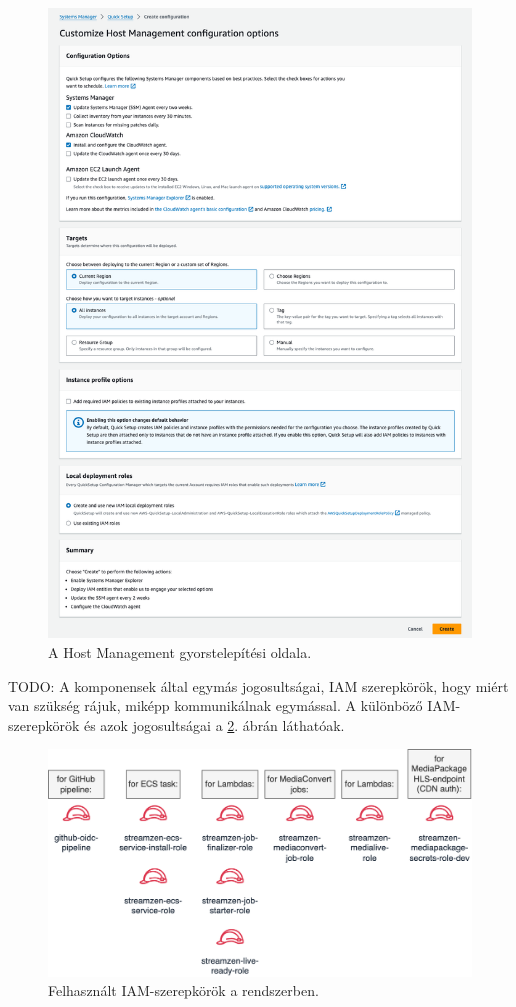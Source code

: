 \begin{figure}[ht]
  \centering
  \includegraphics[width=152mm, keepaspectratio]{figures/hostmgmt.png}
  \caption{A Host Management gyorstelepítési oldala.}
  \label{fig:hostmgmt}
\end{figure}

TODO: A komponensek által egymás jogosultságai, IAM szerepkörök, hogy miért van szükség rájuk, miképp kommunikálnak egymással. A különböző IAM-szerepkörök és azok jogosultságai a \ref{fig:roles}. ábrán láthatóak.

\begin{figure}[ht]
  \centering
  \includegraphics[width=150mm, keepaspectratio]{figures/server_roles.png}
  \caption{Felhasznált IAM-szerepkörök a rendszerben.}
  \label{fig:roles}
\end{figure}

